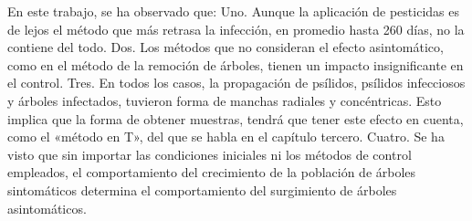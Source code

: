 En este trabajo, se ha observado que: Uno. Aunque la aplicación de pesticidas es de lejos el método que más retrasa la infección, en promedio hasta 260 días, no la contiene del todo. Dos. Los métodos que no consideran el efecto asintomático, como en el método de la remoción de árboles, tienen un impacto insignificante en el control. Tres. En todos los casos, la propagación de psílidos, psílidos infecciosos y árboles infectados, tuvieron forma de manchas radiales y concéntricas. Esto implica que la forma de obtener muestras, tendrá que tener este efecto en cuenta, como el «método en T», del que se habla en el capítulo tercero. Cuatro. Se ha visto que sin importar las condiciones iniciales ni los métodos de control empleados, el comportamiento del crecimiento de la población de árboles sintomáticos determina el comportamiento del surgimiento de árboles asintomáticos.




